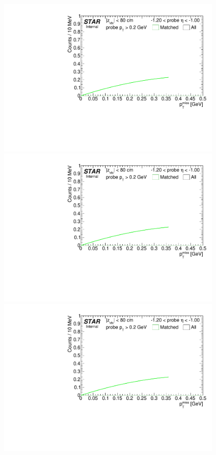 \begin{figure}
{  \includegraphics[width=\linewidth,page=3]{graphics/systematicsEfficiency/TOF_tagAndProbe/Fitting_effVsEta_mc.pdf}\\
  \includegraphics[width=\linewidth,page=4]{graphics/systematicsEfficiency/TOF_tagAndProbe/Fitting_effVsEta_mc.pdf}\\
  \includegraphics[width=\linewidth,page=5]{graphics/systematicsEfficiency/TOF_tagAndProbe/Fitting_effVsEta_mc.pdf}\\
}%
\end{figure}
